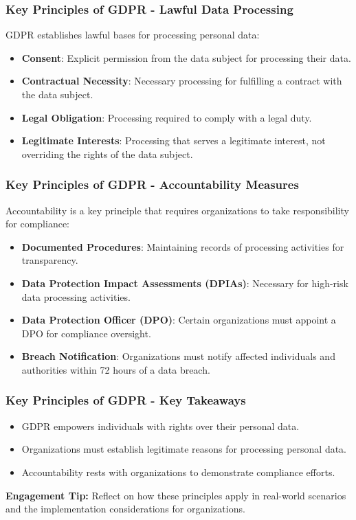 \documentclass[aspectratio=169]{beamer}
\begin{document}
\begin{frame}[fragile]
    \frametitle{Key Principles of GDPR - Lawful Data Processing}
    GDPR establishes lawful bases for processing personal data:
    \begin{itemize}
        \item \textbf{Consent}: Explicit permission from the data subject for processing their data.
        \item \textbf{Contractual Necessity}: Necessary processing for fulfilling a contract with the data subject.
        \item \textbf{Legal Obligation}: Processing required to comply with a legal duty.
        \item \textbf{Legitimate Interests}: Processing that serves a legitimate interest, not overriding the rights of the data subject.
    \end{itemize}
\end{frame}

\begin{frame}[fragile]
    \frametitle{Key Principles of GDPR - Accountability Measures}
    Accountability is a key principle that requires organizations to take responsibility for compliance:
    \begin{itemize}
        \item \textbf{Documented Procedures}: Maintaining records of processing activities for transparency.
        \item \textbf{Data Protection Impact Assessments (DPIAs)}: Necessary for high-risk data processing activities.
        \item \textbf{Data Protection Officer (DPO)}: Certain organizations must appoint a DPO for compliance oversight.
        \item \textbf{Breach Notification}: Organizations must notify affected individuals and authorities within 72 hours of a data breach.
    \end{itemize}
\end{frame}

\begin{frame}[fragile]
    \frametitle{Key Principles of GDPR - Key Takeaways}
    \begin{itemize}
        \item GDPR empowers individuals with rights over their personal data.
        \item Organizations must establish legitimate reasons for processing personal data.
        \item Accountability rests with organizations to demonstrate compliance efforts.
    \end{itemize}
    \textbf{Engagement Tip:} Reflect on how these principles apply in real-world scenarios and the implementation considerations for organizations.
\end{frame}
\end{document}
